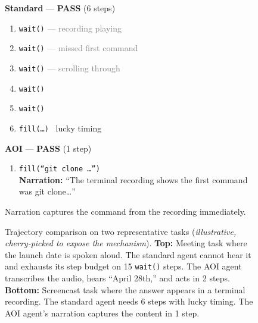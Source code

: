 \documentclass[11pt]{article}
\begin{document}
\begin{figure}[!h]
\vspace{6pt}

\begin{tcolorbox}[
  colback=white, colframe=black!50,
  title={\small\bfseries Screencast task --- ``What was the first command in the terminal recording?''},
  fonttitle=\small, coltitle=white, colbacktitle=black!70,
  width=\textwidth, boxrule=0.5pt,
]
\small
\begin{minipage}[t]{0.47\textwidth}
\textbf{Standard} --- \textcolor{green!50!black}{\textbf{PASS}} (6 steps)\\[2pt]
\begin{enumerate}[leftmargin=*, label=\arabic*., itemsep=1pt]
  \item \texttt{wait()} \textcolor{gray}{\scriptsize --- recording playing}
  \item \texttt{wait()} \textcolor{gray}{\scriptsize --- missed first command}
  \item \texttt{wait()} \textcolor{gray}{\scriptsize --- scrolling through}
  \item \texttt{wait()}
  \item \texttt{wait()}
  \item \texttt{fill(\ldots)} \textcolor{green!50!black}{\scriptsize \checkmark\ lucky timing}
\end{enumerate}
\end{minipage}%
\hfill\vrule\hfill%
\begin{minipage}[t]{0.47\textwidth}
\textbf{AOI} --- \textcolor{green!50!black}{\textbf{PASS}} (1 step)\\[2pt]
\begin{enumerate}[leftmargin=*, label=\arabic*., itemsep=1pt]
  \item \texttt{fill(``git clone \ldots'')} \textcolor{green!50!black}{\scriptsize \checkmark}\\
    {\scriptsize \textbf{Narration:} ``The terminal recording shows the first command was git clone\ldots''}
\end{enumerate}
\vspace{4pt}
\textcolor{green!50!black}{\scriptsize Narration captures the command from the recording immediately.}
\end{minipage}
\end{tcolorbox}
\caption{Trajectory comparison on two representative tasks (\emph{illustrative, cherry-picked to expose the mechanism}).
\textbf{Top:} Meeting task where the launch date is spoken aloud.
The standard agent cannot hear it and exhausts its step budget on 15 \texttt{wait()} steps.
The AOI agent transcribes the audio, hears ``April 28th,'' and acts in 2 steps.
\textbf{Bottom:} Screencast task where the answer appears in a terminal recording.
The standard agent needs 6 steps with lucky timing. The AOI agent's narration captures the content in 1 step.}
\label{fig:trajectories}
\end{figure}
\end{document}

